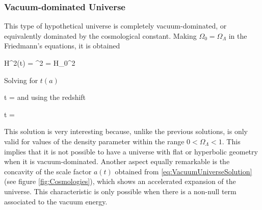 			\subsubsection*{Vacuum-dominated Universe}
		

This type of hypothetical universe is completely vacuum-dominated, or
equivalently dominated by the cosmological constant. Making $\Omega_0 = 
\Omega_\Lambda$ in the Friedmann's equations, it is obtained
			


{ H^2(t) = ^2 = H_0^2  }


Solving for $t(a)$


{ t = 
\ln{} }
and using the redshift



{ t = 
\ln{} }


This solution is very interesting because, unlike the previous solutions, 
is only valid for values of the density parameter within the range 
$0<\Omega_\Lambda <1$. This implies that it is not possible to have a  
universe with flat or hyperbolic geometry when it is vacuum-dominated.
Another aspect equally remarkable is the concavity of the scale factor 
$a(t)$ obtained from \ref{eq:VacuumUniverseSolution} (see figure 
\ref{fig:Cosmologies}), which shows an accelerated expansion of the 
universe. This characteristic is only possible when there is a non-null 
term associated to the vacuum energy.


